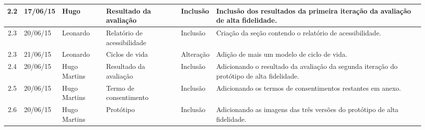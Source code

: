 \begin{longtable}{|c|m{2cm}|m{2.8cm}|m{2.3cm}|m{2.44cm}|m{4.2cm}|}
  2.2 & 17/06/15 & Hugo & Resultado da avaliação & Inclusão & Inclusão dos resultados da primeira iteração da avaliação de alta fidelidade.\\   
  \hline
  
  2.3 & 20/06/15 & Leonardo & Relatório de acessibilidade & Inclusão & Criação da seção contendo o relatório de acessibilidade.\\
  \hline
  
  2.3 & 21/06/15 & Leonardo & Ciclos de vida & Alteração & Adição de mais um modelo de ciclo de vida.\\
  \hline
  
  2.4 & 20/06/15 & Hugo Martins & Resultado da avaliação & Inclusão & Adicionando o resultado da avaliação da segunda iteração do protótipo de alta fidelidade.\\
  \hline
  
  2.5 & 20/06/15 & Hugo Martins & Termo de consentimento & Inclusão & Adicionando os termos de consentimentos restantes em anexo.\\
  \hline
  
  2.6 & 20/06/15 & Hugo Martins & Protótipo & Inclusão & Adicionando as imagens das três versões do protótipo de alta fidelidade.\\
  \hline
\end{longtable}
